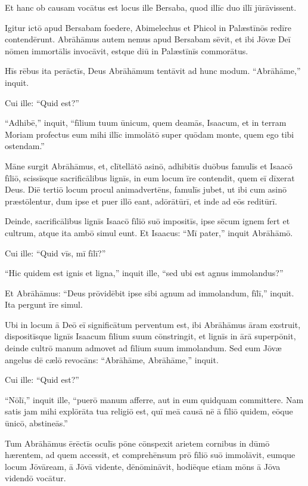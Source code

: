 \Versus Et hanc ob causam vocātus est locus ille Bersaba, quod illīc duo illī jūrāvissent.

\Versus Igitur ictō apud Bersabam foedere, Abimelechus et Phicol in Palæstīnōs redīre contendērunt.
\Versus Abrāhāmus autem nemus apud Bersabam sēvit, et ibi Jōvæ Deī nōmen immortālis invocāvit,
\Versus estque diū in Palæstīnīs commorātus.



\Caput
\Versus Hīs rēbus ita perāctīs, Deus Abrāhāmum tentāvit ad hunc modum. ``Abrāhāme,'' inquit.

Cui ille: ``Quid est?''

\Versus ``Adhibē,'' inquit, ``fīlium tuum ūnicum, quem deamās, Isaacum, et in terram Moriam profectus eum mihi illīc immolātō super quōdam monte, quem ego tibi ostendam.''

\Versus Māne surgit Abrāhāmus, et, clītellātō asinō, adhibitīs duōbus famulīs et Isaacō fīliō, scissīsque sacrificālibus lignīs, in eum locum īre contendit, quem eī dīxerat Deus.
\Versus Diē tertiō locum procul animadvertēns,
\Versus famulīs jubet, ut ibi cum asinō præstōlentur, dum ipse et puer illō eant, adōrātūrī, et inde ad eōs reditūrī.

\Versus Deinde, sacrificālibus lignīs Isaacō fīliō suō impositīs, ipse sēcum ignem fert et cultrum, atque ita ambō simul eunt.
\Versus Et Isaacus: ``Mī pater,'' inquit Abrāhāmō.

Cui ille: ``Quid vīs, mī fīlī?''

``Hic quidem est ignis et ligna,'' inquit ille, ``sed ubi est agnus immolandus?''

\Versus Et Abrāhāmus: ``Deus prōvidēbit ipse sibi agnum ad immolandum, fīlī,'' inquit. Ita pergunt īre simul.

\Versus Ubi in locum ā Deō eī significātum perventum est, ibi Abrāhāmus āram exstruit, dispositīsque lignīs Isaacum fīlium suum cōnstringit, et lignīs in ārā superpōnit,
\Versus deinde cultrō manum admovet ad fīlium suum immolandum.
\Versus Sed eum Jōvæ angelus dē cælō revocāns: ``Abrāhāme, Abrāhāme,'' inquit.

Cui ille: ``Quid est?''

\Versus ``Nōlī,'' inquit ille, ``puerō manum afferre, aut in eum quidquam committere. Nam satis jam mihi explōrāta tua religiō est, quī meā causā nē ā fīliō quidem, eōque ūnicō, abstineās.''

\Versus Tum Abrāhāmus ērēctīs oculīs pōne cōnspexit arietem cornibus in dūmō hærentem, ad quem accessit, et comprehēnsum prō fīliō suō immolāvit,
\Versus eumque locum Jōvāream, ā Jōvā vidente, dēnōmināvit, hodiēque etiam mōns ā Jōva videndō vocātur.

